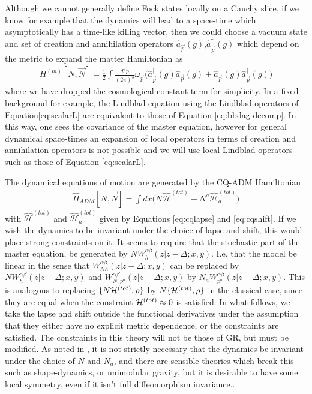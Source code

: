 \documentclass[aps,pra,showpacs,citeautoscript,amsmath,amssymb,floatfix,superscriptaddress,bbm, verbatim,amsfonts,changes,12pt,nofootinbib,longbibliography]{revtex4-2}
\def\z{{z}}
\def\Hq{\hat{H}}
\def\dist{{\Delta}}
\def\superhamtot{{\cal H}^{(tot)}}
\def\qsuperhamtot{\hat{\mathcal{H}}^{(tot)}}
\def\qsupermomtot{\qsuperhamtot}%
\def\matterham{H^{(m)}}
\def\lapsh{[N,\vec{N}]}
\newcommand{\ann}[1]{{\hat{a}}_{\vec{#1}}}
\newcommand{\adag}[1]{{\hat{a}}^\dagger_{\vec{#1}}}
\def\cqadm{{\Hq_{ADM}}}
\def\rate{{W}}
\def\ab{^{\alpha\beta}}
\begin{document}
Although we cannot generally define Fock states locally on a Cauchy slice, if we know for example that the dynamics will lead to a space-time which asymptotically has a time-like killing vector, then we could choose a vacuum state and
	\label{par:fock} 
set of creation and annihilation operators $\ann{p}(g)$,$\adag{p}(g)$ which depend on the metric to expand the matter Hamiltonian as
\begin{align}
\matterham\lapsh
= \frac{1}{2}\int \frac{d^3p}{(2\pi)^3}\omega_{\vec{p}}\Big( \adag{p}(g)\ann{p}(g)+\ann{p}(g)\adag{p}(g)\Big)
\label{eq:bbdag-decomp}
\end{align}
where %
we have dropped the 
cosmological constant term for simplicity. In a fixed background for example, the Lindblad equation using the Lindblad operators of Equation\eqref{eq:scalarL} are equivalent to those of Equation \eqref{eq:bbdag-decomp}. In this way, one sees the covariance of the master equation, however for general dynamical space-times an expansion of local operators in terms of creation and annihilation operators is not possible and we will use local Lindblad operators such as those
 of Equation \eqref{eq:scalarL}. %



The dynamical equations of motion are generated by the CQ-ADM Hamiltonian
\begin{align}
\cqadm[N,\vec{N}]=\int dx \big(N\qsuperhamtot+N^a\qsupermomtot_a\big)
\label{eq:CQADM}
\end{align}
with $\qsuperhamtot$ and $\qsupermomtot_a$ given by Equations \eqref{eq:cqlapse} and \eqref{eq:cqshift}. If we wish the dynamics to be invariant under the choice of lapse and shift, this would place strong constraints on it. 
It seems to
require that the stochastic part of the master equation, be generated by $N\rate_h\ab(\z|\z-\dist;x,y)$. I.e. that the model be linear in the sense that
$\rate\ab_{Nh}(\z|\z-\dist;x,y)$
can be replaced by
$N\rate\ab_{h}(\z|\z-\dist;x,y)$
and
$\rate\ab_{N_ap^a}(\z|\z-\dist;x,y)$
by $N_a\rate\ab_{p^a}(\z|\z-\dist;x,y)$. This is analogous to replacing $\{N\superhamtot,\rho\}$ by $N\{\superhamtot,\rho\}$ in the classical case, since they are equal when the constraint $\superhamtot\approx 0$ is satisfied.
	 In what follows, we take the lapse and shift outside the functional derivatives under the assumption that they
	either have no explicit metric dependence, or the constraints 
	are satisfied. The constraints in this theory will not be those of GR, but must be modified. As noted in \cite{UCL2022constraints}, it is not strictly necessary that the dynamics be invariant under the choice of $N$ and $N_a$, and there are sensible theories which break this such as shape-dynamics\cite{mercati2017shape, Anderson_2005, Gomes_2012}, or unimodular gravity\cite{einstein1952gravitational,van1982exchange,weinberg1989cosmological,unruh1989unimodular,alvarez2005can,smolin2009quantization, shaposhnikov2009scale}, but it is desirable to have some local symmetry, even if it isn't full diffeomorphism invariance.\label{ft:lapse_linear}.
	
\end{document}
